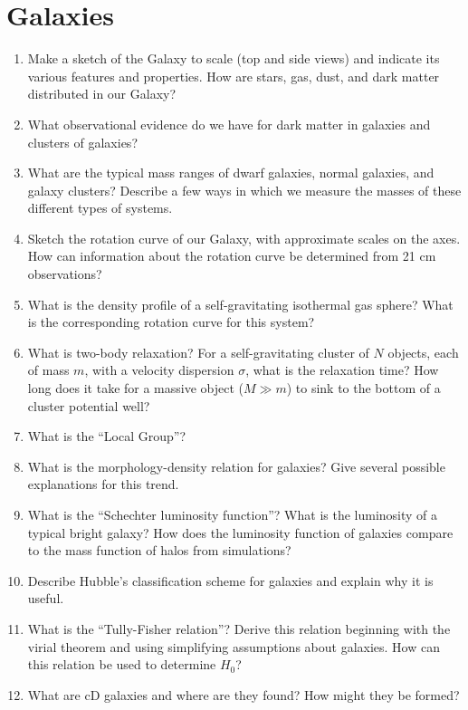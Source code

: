 \documentclass[11pt, oneside]{book}
\begin{document}
\section{Galaxies}

\begin{enumerate}[start=100, itemsep=0.4cm]
    \item Make a sketch of the Galaxy to scale (top and side views) and indicate its various features and properties. How are stars, gas, dust, and dark matter distributed in our Galaxy?
    \item What observational evidence do we have for dark matter in galaxies and clusters of galaxies?
    \item What are the typical mass ranges of dwarf galaxies, normal galaxies, and galaxy clusters? Describe a few ways in which we measure the masses of these different types of systems.
    \item Sketch the rotation curve of our Galaxy, with approximate scales on the axes. How can information about the rotation curve be determined from 21 cm observations?
    \item What is the density profile of a self-gravitating isothermal gas sphere? What is the corresponding rotation curve for this system?
    \item What is two-body relaxation? For a self-gravitating cluster of $N$ objects, each of mass $m$, with a velocity dispersion $\sigma$, what is the relaxation time? How long does it take for a massive object ($M \gg m$) to sink to the bottom of a cluster potential well?
    \item What is the ``Local Group''?
    \item What is the morphology-density relation for galaxies? Give several possible explanations for this trend.
    \item What is the ``Schechter luminosity function''? What is the luminosity of a typical bright galaxy? How does the luminosity function of galaxies compare to the mass function of halos from simulations?
    \item Describe Hubble's classification scheme for galaxies and explain why it is useful.
    \item What is the ``Tully-Fisher relation''? Derive this relation beginning with the virial theorem and using simplifying assumptions about galaxies. How can this relation be used to determine $H_{0}$?
    \item What are cD galaxies and where are they found? How might they be formed?

\end{enumerate}
\end{document}

